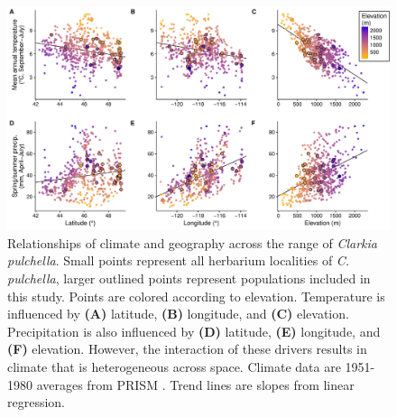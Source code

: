 \documentclass{article}
\begin{document}
\begin{landscape}
\begin{figure}[p]
\centering
\includegraphics[width=21cm]{figs/climate_geo.pdf}
\caption[Relationships of climate and geography across the range of \textit{Clarkia pulchella}]{Relationships of climate and geography across the range of \textit{Clarkia pulchella}. Small points represent all herbarium localities of \textit{C. pulchella}, larger outlined points represent populations included in this study. Points are colored according to elevation. Temperature is influenced by \textbf{(A)} latitude, \textbf{(B)} longitude, and \textbf{(C)} elevation. Precipitation is also influenced by \textbf{(D)} latitude, \textbf{(E)} longitude, and \textbf{(F)} elevation. However, the interaction of these drivers results in climate that is heterogeneous across space.  Climate data are 1951-1980 averages from PRISM \citep{PRISM}. Trend  lines are slopes from linear regression.}
\label{clim_geo}
\end{figure}
\end{landscape}
\end{document}
